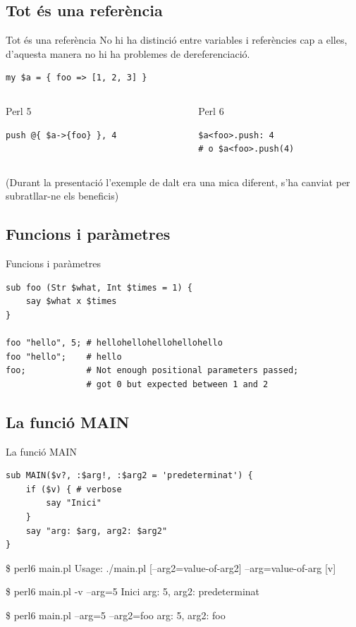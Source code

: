 \documentclass{beamer}
\begin{document}
			\subsection{Tot és una referència}
\begin{frame}[fragile]{Tot és una referència}
	No hi ha distinció entre variables i referències cap a elles,
    d'aquesta manera no hi ha problemes de dereferenciació.
	\begin{verbatim}
my $a = { foo => [1, 2, 3] }
	\end{verbatim}
	\begin{columns}[t]
		\begin{column}{0.5\textwidth}
			\begin{block}{Perl 5}
				\begin{verbatim}
push @{ $a->{foo} }, 4
				\end{verbatim}
			\end{block}
		\end{column}
		\begin{column}{0.5\textwidth}
			\begin{block}{Perl 6}
				\begin{verbatim}
$a<foo>.push: 4
# o $a<foo>.push(4)
				\end{verbatim}
			\end{block}
		\end{column}
	\end{columns}
{\scriptsize(Durant la presentació l'exemple de dalt era una mica diferent,
s'ha canviat per subratllar-ne els beneficis)}
\end{frame}
			\subsection{Funcions i paràmetres}
\begin{frame}[fragile]{Funcions i paràmetres}
	\begin{verbatim}
sub foo (Str $what, Int $times = 1) {
    say $what x $times
}

foo "hello", 5; # hellohellohellohellohello
foo "hello";    # hello
foo;            # Not enough positional parameters passed;
                # got 0 but expected between 1 and 2
	\end{verbatim}
\end{frame}
			\subsection{La funció MAIN}
\begin{frame}[fragile]{La funció MAIN}
\small
\begin{verbatim}
sub MAIN($v?, :$arg!, :$arg2 = 'predeterminat') {
    if ($v) { # verbose
        say "Inici"
    }
    say "arg: $arg, arg2: $arg2"
}
\end{verbatim}
\begin{semiverbatim}
\$ \alert{perl6 main.pl}
Usage:
./main.pl [--arg2=value-of-arg2] --arg=value-of-arg [v]

\$ \alert{perl6 main.pl -v --arg=5}
Inici
arg: 5, arg2: predeterminat

\$ \alert{perl6 main.pl --arg=5 --arg2=foo}
arg: 5, arg2: foo
\end{semiverbatim}
\end{frame}
\end{document}
